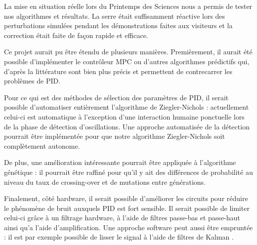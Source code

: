 \documentclass[a4paper,10pt]{report}
\begin{document}
La mise en situation réelle lors du Printemps des Sciences nous a permis de tester nos algorithmes et résultats. La serre était suffisamment réactive lors des perturbations simulées pendant les démonstrations faites aux visiteurs et la correction était faite de façon rapide et efficace.

Ce projet aurait pu être étendu de plusieurs manières. Premièrement, il aurait été possible d'implémenter le contrôleur MPC ou d'autres algorithmes prédictifs qui, d'après la littérature sont bien plus précis et permettent de contrecarrer les problèmes de PID.

Pour ce qui est des méthodes de sélection des paramètres de PID, il serait possible d'automatiser entièrement l'algorithme de Ziegler-Nichols : actuellement celui-ci est automatique à l'exception d'une interaction humaine ponctuelle lors de la phase de détection d'oscillations. Une approche automatisée de la détection pourrait être implémentée pour que notre algorithme Ziegler-Nichols soit complètement autonome.

De plus, une amélioration intéressante pourrait être appliquée à l'algorithme génétique : il pourrait être raffiné pour qu'il y ait des différences de probabilité au niveau du taux de crossing-over et de mutations entre générations.

Finalement, côté hardware, il serait possible d'améliorer les circuits pour réduire le phénomène de bruit auxquels PID est fort sensible. Il serait possible de limiter celui-ci grâce à un filtrage hardware, à l'aide de filtres passe-bas et passe-haut ainsi qu'a l'aide d'amplification. Une approche software peut aussi être empruntée : il est par exemple possible de lisser le signal à l'aide de filtres de Kalman \cite{kalman1960new}.





\end{document}
